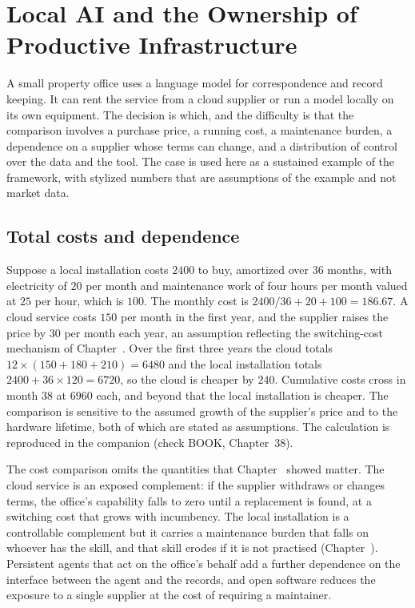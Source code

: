 \chapter{Local AI and the Ownership of Productive Infrastructure}\label{ch:38}

A small property office uses a language model for correspondence and record keeping. It can rent the service from a cloud supplier or run a model locally on its own equipment. The decision is which, and the difficulty is that the comparison involves a purchase price, a running cost, a maintenance burden, a dependence on a supplier whose terms can change, and a distribution of control over the data and the tool. The case is used here as a sustained example of the framework, with stylized numbers that are assumptions of the example and not market data.

\section{Total costs and dependence}

Suppose a local installation costs $2400$ to buy, amortized over $36$ months, with electricity of $20$ per month and maintenance work of four hours per month valued at $25$ per hour, which is $100$. The monthly cost is $2400/36+20+100=186.67$. A cloud service costs $150$ per month in the first year, and the supplier raises the price by $30$ per month each year, an assumption reflecting the switching-cost mechanism of Chapter~. Over the first three years the cloud totals $12\times(150+180+210)=6480$ and the local installation totals $2400+36\times 120=6720$, so the cloud is cheaper by $240$. Cumulative costs cross in month $38$ at $6960$ each, and beyond that the local installation is cheaper. The comparison is sensitive to the assumed growth of the supplier's price and to the hardware lifetime, both of which are stated as assumptions. The calculation is reproduced in the companion (check BOOK, Chapter~38).

The cost comparison omits the quantities that Chapter~ showed matter. The cloud service is an exposed complement: if the supplier withdraws or changes terms, the office's capability falls to zero until a replacement is found, at a switching cost that grows with incumbency. The local installation is a controllable complement but it carries a maintenance burden that falls on whoever has the skill, and that skill erodes if it is not practised (Chapter~). Persistent agents that act on the office's behalf add a further dependence on the interface between the agent and the records, and open software reduces the exposure to a single supplier at the cost of requiring a maintainer.

